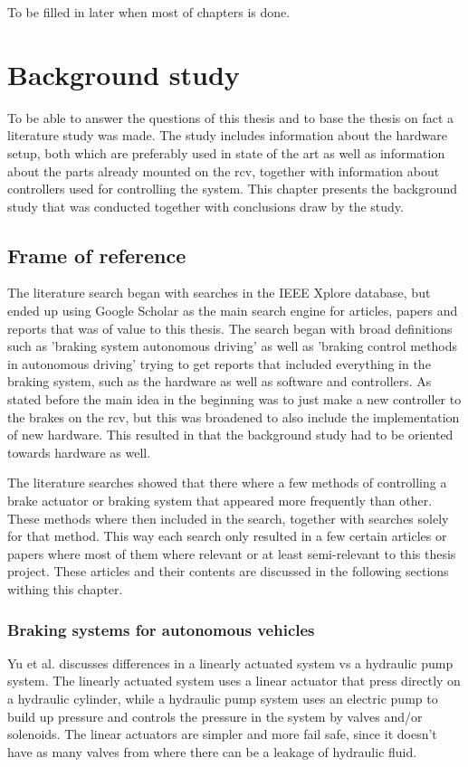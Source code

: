 \documentclass[a4paper,11pt]{kth-mag}
\begin{document}
To be filled in later when most of chapters is done.



\chapter{Background study}
To be able to answer the questions of this thesis and to base the thesis on fact a literature study was made. The study includes information about the hardware setup, both which are preferably used in state of the art as well as information about the parts already mounted on the \gls{rcv}, together with information about controllers used for controlling the system. This chapter presents the background study that was conducted together with conclusions draw by the study.


\section{Frame of reference}
The literature search began with searches in the IEEE Xplore database, but ended up using Google Scholar as the main search engine for articles, papers and reports that was of value to this thesis. The search began with broad definitions such as 'braking system autonomous driving' as well as 'braking control methods in autonomous driving' trying to get reports that included everything in the braking system, such as the hardware as well as software and controllers. As stated before the main idea in the beginning was to just make a new controller to the brakes on the \gls{rcv}, but this was broadened to also include the implementation of new hardware. This resulted in that the background study had to be oriented towards hardware as well. 

The literature searches showed that there where a few methods of controlling a brake actuator or braking system that appeared more frequently than other. These methods where then included in the search, together with searches solely for that method. This way each search only resulted in a few certain articles or papers where most of them where relevant or at least semi-relevant to this thesis project. These articles and their contents are discussed in the following sections withing this chapter.



\subsection{Braking systems for autonomous vehicles}
Yu et al. \cite{Yu} discusses differences in a linearly actuated system vs a hydraulic pump system. The linearly actuated system uses a linear actuator that press directly on a hydraulic cylinder, while a hydraulic pump system uses an electric pump to build up pressure and controls the pressure in the system by valves and/or solenoids. The linear actuators are simpler and more fail safe, since it doesn't have as many valves from where there can be a leakage of hydraulic fluid. 
\end{document}

